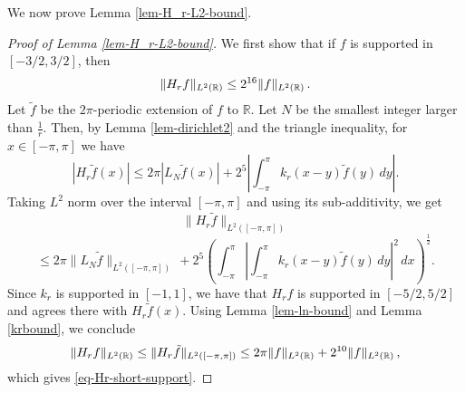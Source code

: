 {%

We now prove Lemma \ref{lem-H_r-L2-bound}.

\begin{proof}[Proof of Lemma \ref{lem-H_r-L2-bound}]
    We first show that if $f$ is supported in $[-3/2, 3/2]$, then
    \begin{equation}
        \label{eq-Hr-short-support}
        \|H_r f\|_{L^2({\mathbb{R}})} \le 2^{16} \|f\|_{L^2({\mathbb{R}})}\,.
    \end{equation}
    Let $\tilde{f}$ be the $2\pi$-periodic extension of $f$ to $\mathbb{R}$. Let $N$ be the smallest
    integer larger than $\frac 1r$. Then, by Lemma \ref{lem-dirichlet2} and the triangle inequality, for $x\in [-\pi, \pi]$ we have
    \begin{equation*}
        |H_r \tilde{f}(x)|\leq 2\pi |L_N \tilde{f}(x)|+2^{5}\left|\int_{-\pi}^{\pi}k_r(x-y)\tilde{f}(y)\, dy\right|.
    \end{equation*}
    Taking $L^2$ norm over the interval $[-\pi, \pi]$ and using its sub-additivity, we get
    $$
         \|H_r \tilde{f}\|_{L^2([-\pi, \pi])}
    $$
    \begin{equation*}
       \leq 2\pi \|L_N \tilde{f}\|_{L^2([-\pi, \pi])}\, + 2^{5}\left(\int_{-\pi}^{\pi} \left|\int_{-\pi}^{\pi}k_r(x-y)\tilde{f}(y)\, dy\right|^2\, dx\right)^{\frac{1}{2}}.
    \end{equation*}
    Since $k_r$ is supported in $[-1,1]$, we have that $H_rf$ is supported in $[-5/2, 5/2]$ and agrees there with $H_r \tilde f(x)$.
    Using Lemma \ref{lem-ln-bound} and Lemma \ref{krbound},  we conclude
    \begin{equation}
        \|H_r f\|_{L^2({\mathbb{R}})} \le \|H_r \tilde f\|_{L^2([-\pi, \pi])} \leq 2\pi \|f\|_{L^2({\mathbb{R}})} + 2^{10}\|f\|_{L^2({\mathbb{R}})}\,,
    \end{equation}
    which gives \eqref{eq-Hr-short-support}.


\end{proof}}
